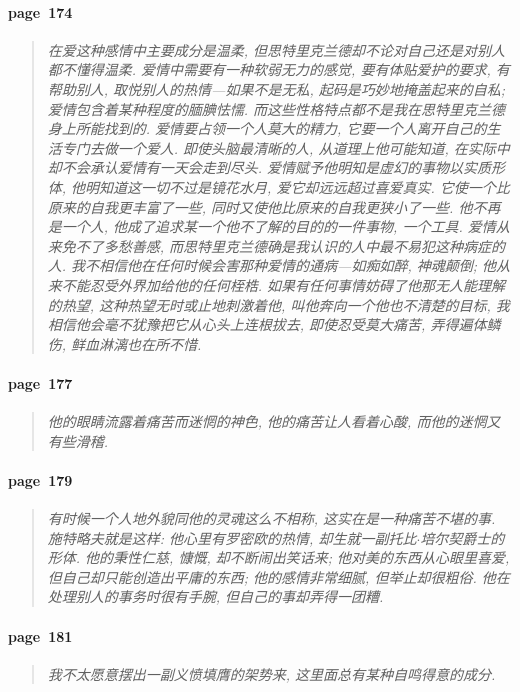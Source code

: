 \paragraph*{page~174}
\begin{quotation}
    \itshape
    在爱这种感情中主要成分是温柔, 但思特里克兰德却不论对自己还是对别人都不懂得温柔. 爱情中需要有一种软弱无力的感觉, 要有体贴爱护的要求, 有帮助别人, 取悦别人的热情---如果不是无私, 起码是巧妙地掩盖起来的自私; 爱情包含着某种程度的腼腆怯懦. 而这些性格特点都不是我在思特里克兰德身上所能找到的. 爱情要占领一个人莫大的精力, 它要一个人离开自己的生活专门去做一个爱人. 即使头脑最清晰的人, 从道理上他可能知道, 在实际中却不会承认爱情有一天会走到尽头. 爱情赋予他明知是虚幻的事物以实质形体, 他明知道这一切不过是镜花水月, 爱它却远远超过喜爱真实. 它使一个比原来的自我更丰富了一些, 同时又使他比原来的自我更狭小了一些. 他不再是一个人, 他成了追求某一个他不了解的目的的一件事物, 一个工具. 爱情从来免不了多愁善感, 而思特里克兰德确是我认识的人中最不易犯这种病症的人. 我不相信他在任何时候会害那种爱情的通病---如痴如醉, 神魂颠倒; 他从来不能忍受外界加给他的任何桎梏. 如果有任何事情妨碍了他那无人能理解的热望, 这种热望无时或止地刺激着他, 叫他奔向一个他也不清楚的目标, 我相信他会毫不犹豫把它从心头上连根拔去, 即使忍受莫大痛苦, 弄得遍体鳞伤, 鲜血淋漓也在所不惜. 
\end{quotation}

\paragraph*{page~177}
\begin{quotation}
    \itshape
    他的眼睛流露着痛苦而迷惘的神色, 他的痛苦让人看着心酸, 而他的迷惘又有些滑稽. 
\end{quotation}

\paragraph*{page~179}
\begin{quotation}
    \itshape
    有时候一个人地外貌同他的灵魂这么不相称, 这实在是一种痛苦不堪的事. 施特略夫就是这样: 他心里有罗密欧的热情, 却生就一副托比$\cdot$培尔契爵士的形体. 他的秉性仁慈, 慷慨, 却不断闹出笑话来; 他对美的东西从心眼里喜爱, 但自己却只能创造出平庸的东西; 他的感情非常细腻, 但举止却很粗俗. 他在处理别人的事务时很有手腕, 但自己的事却弄得一团糟. 
\end{quotation}

\paragraph*{page~181}
\begin{quotation}
    \itshape
    我不太愿意摆出一副义愤填膺的架势来, 这里面总有某种自鸣得意的成分.
\end{quotation}

